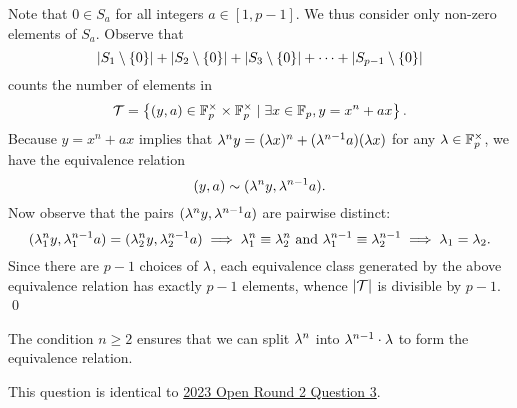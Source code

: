 
 Note that $0 \in S_a$ for all integers $a \in [1, p-1]$. We thus consider only non-zero elements of $S_a$. Observe that \[\left\lvert S_1 \setminus \left\lbrace 0 \right\rbrace \right\rvert + \left\lvert S_2 \setminus \left\lbrace 0 \right\rbrace \right\rvert + \left\lvert S_3 \setminus \left\lbrace 0 \right\rbrace \right\rvert + \cdots + \left\lvert S_{p-1} \setminus \left\lbrace 0 \right\rbrace \right\rvert\] counts the number of elements in \[\mathcal{T} = \left\lbrace (y, a) \in \mathbb{F}_p^\times \times \mathbb{F}_p^\times \mid \exists x \in \mathbb{F}_p, y = x^n + ax \right\rbrace.\] Because $y = x^n + ax$ implies that $\lambda^n y = (\lambda x)^n + (\lambda^{n-1} a)(\lambda x)$ for any $\lambda \in \mathbb{F}_p^\times$, we have the equivalence relation \[(y, a) \sim (\lambda^n y, \lambda^{n-1} a).\] Now observe that the pairs $(\lambda^n y, \lambda^{n-1} a)$ are pairwise distinct: \[(\lambda_1^n y, \lambda_1^{n-1} a) = (\lambda_2^n y, \lambda_2^{n-1} a) \implies \lambda_1^n \equiv \lambda_2^n \text{ and } \lambda_1^{n-1} \equiv \lambda_2^{n-1} \implies \lambda_1 = \lambda_2.\] Since there are $p-1$ choices of $\lambda$, each equivalence class generated by the above equivalence relation has exactly $p-1$ elements, whence $\left\lvert \mathcal{T} \right\rvert$ is divisible by $p-1$. \qed

\begin{remark}
    The condition $n \geq 2$ ensures that we can split $\lambda^n$ into $\lambda^{n-1} \cdot \lambda$ to form the equivalence relation.
\end{remark}

\begin{remark}
    This question is identical to \hyperref[A::2023-O-2-3]{2023 Open Round 2 Question 3}.
\end{remark}
